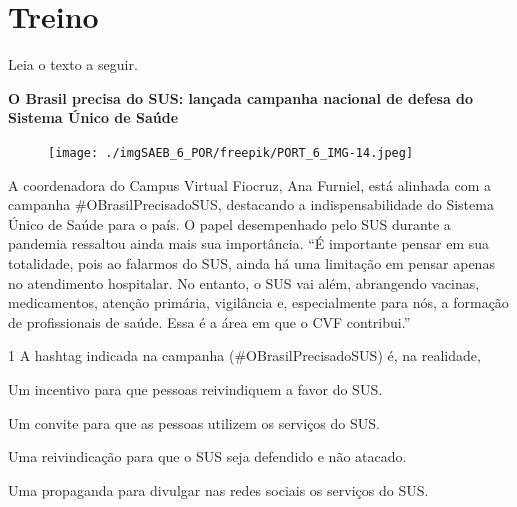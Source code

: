 \section*{Treino}

Leia o texto a seguir.


\begin{myquote}
\begin{center}
\textbf{O Brasil precisa do SUS: lançada campanha nacional de defesa do
Sistema Único de Saúde}
\end{center}

\begin{figure}[H]
\centering\texttt{[image: ./imgSAEB\_6\_POR/freepik/PORT\_6\_IMG-14.jpeg]}
\end{figure}
A coordenadora do Campus Virtual Fiocruz, Ana Furniel, está alinhada com
a campanha \#OBrasilPrecisadoSUS, destacando a indispensabilidade do
Sistema Único de Saúde para o país. O papel desempenhado pelo SUS
durante a pandemia ressaltou ainda mais sua importância. ``É importante
pensar em sua totalidade, pois ao falarmos do SUS, ainda há uma
limitação em pensar apenas no atendimento hospitalar. No entanto, o SUS
vai além, abrangendo vacinas, medicamentos, atenção primária, vigilância
e, especialmente para nós, a formação de profissionais de saúde. Essa é
a área em que o CVF contribui.''

\end{myquote}

\num{1} A hashtag indicada na campanha (\#OBrasilPrecisadoSUS) é, na realidade,

\begin{escolha}
\item Um incentivo para que pessoas reivindiquem a favor do SUS.
\item Um convite para que as pessoas utilizem os serviços do SUS.
\item Uma reivindicação para que o SUS seja defendido e não atacado.
\item Uma propaganda para divulgar nas redes sociais os serviços do SUS.
\end{escolha}


